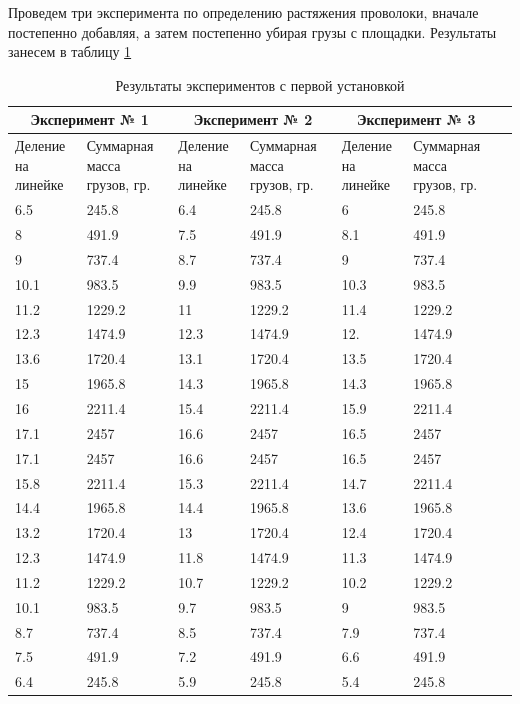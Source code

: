 \documentclass[a4paper, 12pt]{article}
\begin{document}
Проведем три эксперимента по определению растяжения проволоки, вначале постепенно добавляя, а затем постепенно убирая грузы с площадки. Результаты занесем в таблицу \ref{tabl:data1}

\begin{table}
    \centering
    \begin{tabular}{| p{5em} | p{5em} | p{5em} | p{5em} | p{5em}| p{5em} | p{5em} |}
        \hline
        \multicolumn{2}{|c|}{Эксперимент № 1} & \multicolumn{2}{|c|}{Эксперимент № 2} & \multicolumn{2}{|c|}{Эксперимент № 3} \\ \hline 
        Деление на линейке & Суммарная масса грузов, гр. & Деление на линейке & Суммарная масса грузов, гр. & Деление на линейке & Суммарная масса грузов, гр. \\ \hline
        6.5  & 245.8  & 6.4  & 245.8  & 6    & 245.8  \\ \hline
        8    & 491.9  & 7.5  & 491.9  & 8.1  & 491.9  \\ \hline
        9    & 737.4  & 8.7  & 737.4  & 9    & 737.4  \\ \hline
        10.1 & 983.5  & 9.9  & 983.5  & 10.3 & 983.5  \\ \hline
        11.2 & 1229.2 & 11   & 1229.2 & 11.4 & 1229.2 \\ \hline
        12.3 & 1474.9 & 12.3 & 1474.9 & 12.  & 1474.9 \\ \hline
        13.6 & 1720.4 & 13.1 & 1720.4 & 13.5 & 1720.4 \\ \hline
        15   & 1965.8 & 14.3 & 1965.8 & 14.3 & 1965.8 \\ \hline
        16   & 2211.4 & 15.4 & 2211.4 & 15.9 & 2211.4 \\ \hline
        17.1 & 2457   & 16.6 & 2457   & 16.5 & 2457   \\ \hline
        17.1 & 2457   & 16.6 & 2457   & 16.5 & 2457   \\ \hline
        15.8 & 2211.4 & 15.3 & 2211.4 & 14.7 & 2211.4 \\ \hline
        14.4 & 1965.8 & 14.4 & 1965.8 & 13.6 & 1965.8 \\ \hline
        13.2 & 1720.4 & 13   & 1720.4 & 12.4 & 1720.4 \\ \hline
        12.3 & 1474.9 & 11.8 & 1474.9 & 11.3 & 1474.9 \\ \hline
        11.2 & 1229.2 & 10.7 & 1229.2 & 10.2 & 1229.2 \\ \hline
        10.1 & 983.5  & 9.7  & 983.5  & 9    & 983.5  \\ \hline
        8.7  & 737.4  & 8.5  & 737.4  & 7.9  & 737.4  \\ \hline
        7.5  & 491.9  & 7.2  & 491.9  & 6.6  & 491.9  \\ \hline
        6.4  & 245.8  & 5.9  & 245.8  & 5.4  & 245.8  \\ \hline
    \end{tabular}
    \caption{Результаты экспериментов с первой установкой}
    \label{tabl:data1}
\end{table}
\end{document}
